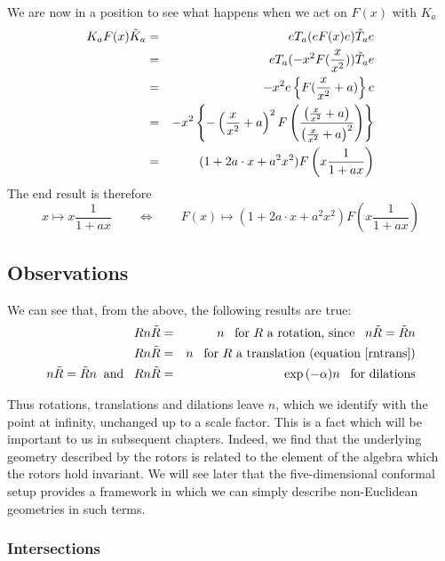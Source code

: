 %
We are now in a position to see what happens when we act
on $F(x)$ with $K_a$
%
\begin{eqnarray}
 K_a F(x) \tilde{K}_a & = & eT_a(eF(x)e)\tilde{T}_a e \nonumber \\
               & = & eT_a( - x^2 F(\frac{x}{x^2}))\tilde{T}_a e \nonumber \\
       & = &  -x^2 e\left\{ F(\frac{x}{x^2} +a)\right\} e \nonumber \\
& = & -x^2\left\{- \left(\frac{x}{x^2} + a\right)^2
F\left(\frac{\left(
\frac{x}{x^2} + a\right)}{\left(\frac{x}{x^2} + a\right)^2}\right)\right\} \nonumber \\
          & = & (1 + 2a\cdot x + a^2x^2)F\left( x\frac{1}{1+ax}\right)
\end{eqnarray}
%
The end result is therefore
%
\begin{equation}
x\mapsto x\frac{1}{1+ax}  \qquad \Leftrightarrow \qquad  F(x)
\mapsto (1+2a\cdot x + a^2x^2)F\left(x\frac{1}{1+ax}\right)
\end{equation}
%

%
\subsection{Observations}
We can see that, from the above, the following results are true:
%
\begin{eqnarray}
R n \tilde{R} &  =  &   n \;\;\; \mbox{for $R$ a
rotation, since} \;\;\; n\tilde{R}=\tilde{R}n
 \nonumber \\
 R n \tilde{R} &  =  &   n \;\;\; \mbox{for $R$ a
translation (equation~\ref{rntrans}}) \nonumber \\
n\tilde{R}=\tilde{R}n \;\;\mbox{and}\;\;\; R n \tilde{R}
& = & \exp{(-\alpha )}n \;\;\;\mbox{for dilations} \nonumber
\end{eqnarray}
%

Thus rotations, translations and dilations leave $n$, which we identify with
the point at infinity, unchanged up to a scale factor. This is a fact which
will be important to us in subsequent chapters. Indeed, we find that the
underlying geometry described by the rotors is related to the element of the
algebra which the rotors hold invariant. We will see later that the five-dimensional
conformal setup provides a framework in which we can simply describe
non-Euclidean geometries in such terms.


\subsubsection{Intersections}


